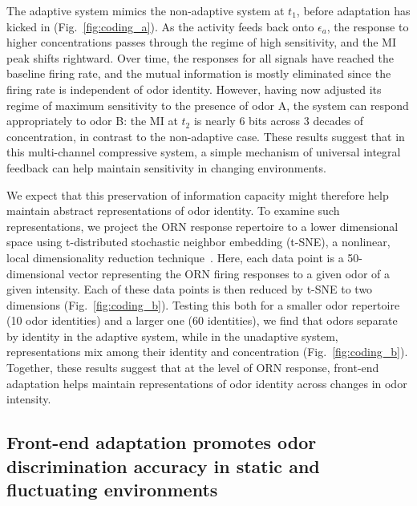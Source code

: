 \documentclass[9pt,twocolumn,twoside,lineno]{pnas-new}
\begin{document}
The adaptive system mimics the non-adaptive system at $t_1$,  before adaptation has kicked in (Fig.~\ref{fig:coding_a}). As the activity feeds back onto $\epsilon_a$, the response to higher concentrations passes through the regime of high sensitivity, and the MI peak shifts rightward. Over time, the responses for all signals have reached the baseline firing rate, and the mutual information is mostly eliminated since the firing rate is independent of odor identity. However, having now adjusted its regime of maximum sensitivity to the presence of odor A, the system can respond appropriately to odor B: the MI at $t_2$ is nearly 6 bits across 3 decades of concentration, in contrast to the non-adaptive case. These results suggest that in this multi-channel compressive system, a simple mechanism of universal integral feedback can help maintain sensitivity in changing environments.

We expect that this preservation of information capacity might therefore help maintain  abstract representations of odor identity. To examine such  representations, we project the ORN  response repertoire to a lower dimensional space using t-distributed stochastic neighbor embedding (t-SNE), a nonlinear, local dimensionality reduction technique~\cite{tsne}. Here, each data point is a 50-dimensional vector representing the ORN firing responses to a given odor of a given intensity. Each of these data points is then reduced by t-SNE to  two dimensions (Fig.~\ref{fig:coding_b}). %
Testing this both for a smaller odor repertoire (10 odor identities) and a larger one (60 identities), we find that odors  separate by identity in the adaptive system, while in the unadaptive system, representations  mix among their identity and concentration (Fig.~\ref{fig:coding_b}). Together, these results suggest that at the level of ORN response, front-end adaptation helps maintain representations of odor identity across changes in odor intensity.




\subsection{Front-end adaptation promotes odor discrimination accuracy in static and fluctuating environments}
\end{document}
